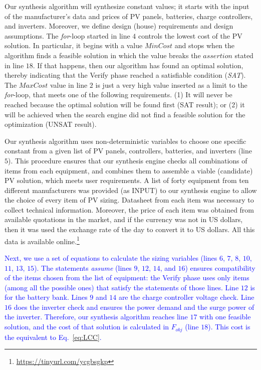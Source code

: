 \documentclass[runningheads]{llncs}
\begin{document}
Our synthesis algorithm will synthesize constant values; 
it starts with the input of the manufacturer's data and prices of PV panels, batteries, charge controllers, and inverters. Moreover, we define design (house) requirements and design assumptions. 
%
The \textit{for}-loop started in line $4$ controls the lowest cost of the PV solution. In particular, it begins with a value $MinCost$ and stops when the algorithm finds a feasible solution in which the value breaks the $assertion$ stated in line $18$. If that happens, then our algorithm has found an optimal solution, thereby indicating that the {\sc Verify} phase reached a satisfiable condition (\textit{SAT}). The $MaxCost$ value in line $2$ is just a very high value inserted as a limit to the \textit{for}-loop, that meets one of the following requirements. (1) It will never be reached because the optimal solution will be found first (SAT result); or (2) it will be achieved when the search engine did not find a feasible solution for the optimization (UNSAT result).

Our synthesis algorithm uses non-deterministic variables to choose one specific constant from a given list of PV panels, controllers, batteries, and inverters (line $5$). This procedure ensures that our synthesis engine checks all combinations of items from each equipment, and combines them to assemble a viable (candidate) PV solution, which meets user requirements. A list of forty equipment from ten different manufacturers was provided (as INPUT) to our synthesis engine to allow the choice of every item of PV sizing. Datasheet from each item was necessary to collect technical information. Moreover, the price of each item was obtained from available quotations in the market, and if the currency was not in US dollars, then it was used the exchange rate of the day to convert it to US dollars. All this data is available online.\footnote{\url{https://tinyurl.com/ycgbsgkp}}

\textcolor{blue}{Next, we use a set of equations to calculate the sizing variables (lines $6$, $7$, $8$, $10$, $11$, $13$, $15$). The statements \textit{assume} (lines $9$, $12$, $14$, and $16$) ensures compatibility of the items chosen from the list of equipment: the {\sc Verify} phase uses only items (among all the possible ones) that satisfy the statements of those lines. Line $12$ is for the battery bank. Lines $9$ and $14$ are the charge controller voltage check. Line $16$ does the inverter check and ensures the power demand and the surge power of the inverter. Therefore, our synthesis algorithm reaches line $17$ with one feasible solution, and the cost of that solution is calculated in $F_{obj}$ (line $18$). This cost is the equivalent to Eq.~\eqref{eq:LCC}.}
\end{document}
